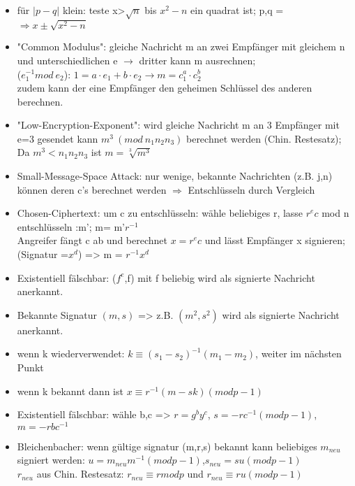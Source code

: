 \begin{itemize}
\item für $\lvert p-q \rvert$ klein: teste x>$\sqrt{n}$ bis $x^2 -n$ ein quadrat ist; p,q = $\Rightarrow x \pm \sqrt{x^2 -n}$
\item "Common Modulus": gleiche Nachricht m an zwei Empfänger mit gleichem n und unterschiedlichen e $\rightarrow$ dritter kann m ausrechnen;\\
\Euklid ($e_1^{-1} mod~e_2$): $ 1= a \cdot e_1 + b \cdot e_2 \rightarrow m = c_1^a \cdot c_2^b$\\
zudem kann der eine Empfänger den geheimen Schlüssel des anderen berechnen. 
\item "Low-Encryption-Exponent": wird gleiche Nachricht m an 3 Empfänger mit e=3 gesendet kann $m^3~(mod~n_1n_2n_3)$ berechnet werden (Chin. Restesatz);\\
Da $m^3 < n_1n_2n_3$ ist $m = \sqrt[3]{m^3}$
\item Small-Message-Space Attack: nur wenige, bekannte Nachrichten (z.B. j,n) können deren c's berechnet werden $\Rightarrow$ Entschlüsseln durch Vergleich 
\item Chosen-Ciphertext: um c zu entschlüsseln: wähle beliebiges r, lasse $r^ec$ mod n entschlüsseln :m'; m= m'$r^{-1}$\\ 
Angreifer fängt c ab und berechnet $x=r^ec$ und lässt Empfänger x signieren; \\
(Signatur =$x^d$) => m = $r^{-1}x^d$ 
\item Existentiell fälschbar: ($f^e$,f) mit f beliebig wird als signierte Nachricht anerkannt.
\item Bekannte Signatur $(m,s) $ => z.B. $(m^2,s^2)$ wird als signierte Nachricht anerkannt.
\end{itemize}
\begin{itemize}
\item wenn k wiederverwendet: $k \equiv (s_1 - s_2)^{-1}(m_1 - m_2)$, weiter im nächsten Punkt 
\item wenn k bekannt dann ist $x \equiv r^{-1} (m -sk) (mod p-1)$
\item Existentiell fälschbar: wähle b,c => $r= g^by^c$, $s= -rc^{-1} (mod p-1)$, $m = -rbc^{-1}$
\item Bleichenbacher: wenn gültige signatur (m,r,s) bekannt kann beliebiges $m_{neu}$ signiert werden: 
$u = m_{neu}m^{-1} (mod p-1)$,$s_{neu} = su (mod p-1)  $ \\
$r_{neu}$ aus Chin. Restesatz: $r_{neu} \equiv r mod p$ und $r_{neu} \equiv ru (mod p-1)$
\end{itemize}

